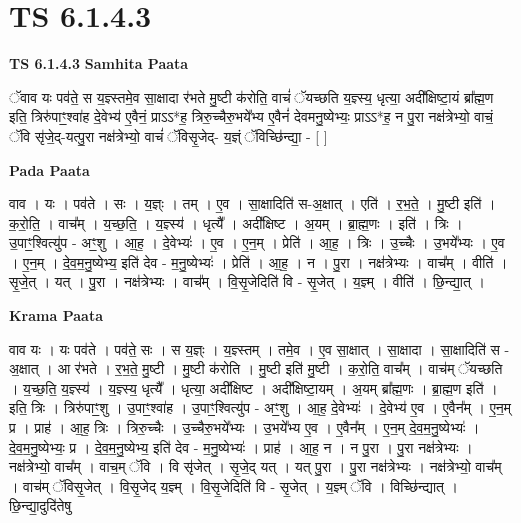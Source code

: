 \documentclass[17pt]{extarticle}
\begin{document}
\section{ TS 6.1.4.3 }

\textbf{TS 6.1.4.3 } \newline
\textbf{Samhita Paata} \newline

ॅवाव यः पव॑ते॒ स य॒ज्ञ्स्तमे॒व सा॒क्षादा र॑भते मु॒ष्टी क॑रोति॒ वाचं॑ ॅयच्छति य॒ज्ञ्स्य॒ धृत्या॒ अदी᳚क्षिष्टा॒यं ब्रा᳚ह्म॒ण इति॒ त्रिरु॑पाꣳ॒॒श्वा॑ह दे॒वेभ्य॑ ए॒वैनं॒ प्राऽऽ*ह॒ त्रिरु॒च्चैरु॒भये᳚भ्य ए॒वैनं॑ देवमनु॒ष्येभ्यः॒ प्राऽऽ*ह॒ न पु॒रा नक्ष॑त्रेभ्यो॒ वाचं॒ ॅवि सृ॑जे॒द्-यत्पु॒रा नक्ष॑त्रेभ्यो॒ वाचं॑ ॅविसृ॒जेद्- य॒ज्ञ्ं ॅविच्छि॑न्द्या॒ - [  ] \newline

\textbf{Pada Paata} \newline

वाव । यः । पव॑ते । सः । य॒ज्ञ्ः । तम् । ए॒व । सा॒क्षादिति॑ स-अ॒क्षात् । एति॑ । र॒भ॒ते॒ । मु॒ष्टी इति॑ । क॒रो॒ति॒ । वाच᳚म् । य॒च्छ॒ति॒ । य॒ज्ञ्स्य॑ । धृत्यै᳚ । अदी᳚क्षिष्ट । अ॒यम् । ब्रा॒ह्म॒णः । इति॑ । त्रिः । उ॒पाꣳ॒॒श्वित्यु॑प - अꣳ॒॒शु । आ॒ह॒ । दे॒वेभ्यः॑ । ए॒व । ए॒न॒म् । प्रेति॑ । आ॒ह॒ । त्रिः । उ॒च्चैः । उ॒भये᳚भ्यः । ए॒व । ए॒न॒म् । दे॒व॒म॒नु॒ष्येभ्य॒ इति॑ देव - म॒नु॒ष्येभ्यः॑ । प्रेति॑ । आ॒ह॒ । न । पु॒रा । नक्ष॑त्रेभ्यः । वाच᳚म् । वीति॑ । सृ॒जे॒त् । यत् । पु॒रा । नक्ष॑त्रेभ्यः । वाच᳚म् । वि॒सृ॒जेदिति॑ वि - सृ॒जेत् । य॒ज्ञ्म् । वीति॑ । छि॒न्द्या॒त् ।  \newline


\textbf{Krama Paata} \newline

वाव यः । यः पव॑ते । पव॑ते॒ सः । स य॒ज्ञ्ः । य॒ज्ञ्स्तम् । तमे॒व । ए॒व सा॒क्षात् । सा॒क्षादा । सा॒क्षादिति॑ स - अ॒क्षात् । आ र॑भते । र॒भ॒ते॒ मु॒ष्टी । मु॒ष्टी क॑रोति । मु॒ष्टी इति॑ मु॒ष्टी । क॒रो॒ति॒ वाच᳚म् । वाच॑म् ॅयच्छति । य॒च्छ॒ति॒ य॒ज्ञ्स्य॑ । य॒ज्ञ्स्य॒ धृत्यै᳚ । धृत्या॒ अदी᳚क्षिष्ट । अदी᳚क्षिष्टा॒यम् । अ॒यम् ब्रा᳚ह्म॒णः । ब्रा॒ह्म॒ण इति॑ । इति॒ त्रिः । त्रिरु॑पाꣳ॒॒शु । उ॒पाꣳ॒॒श्वा॑ह । उ॒पाꣳ॒॒श्वित्यु॑प - अꣳ॒॒शु । आ॒ह॒ दे॒वेभ्यः॑ । दे॒वेभ्य॑ ए॒व । ए॒वैन᳚म् । ए॒न॒म् प्र । प्राह॑ । आ॒ह॒ त्रिः । त्रिरु॒च्चैः । उ॒च्चैरु॒भये᳚भ्यः । उ॒भये᳚भ्य ए॒व । ए॒वैन᳚म् । ए॒न॒म् दे॒व॒म॒नु॒ष्येभ्यः॑ । दे॒व॒म॒नु॒ष्येभ्यः॒ प्र । दे॒व॒म॒नु॒ष्येभ्य॒ इति॑ देव - म॒नु॒ष्येभ्यः॑ । प्राह॑ । आ॒ह॒ न । न पु॒रा । पु॒रा नक्ष॑त्रेभ्यः । नक्ष॑त्रेभ्यो॒ वाच᳚म् । वाच॒म् ॅवि । वि सृ॑जेत् । सृ॒जे॒द् यत् । यत् पु॒रा । पु॒रा नक्ष॑त्रेभ्यः । नक्ष॑त्रेभ्यो॒ वाच᳚म् । वाच॑म् ॅविसृ॒जेत् । वि॒सृ॒जेद् य॒ज्ञ्म् । वि॒सृ॒जेदिति॑ वि - सृ॒जेत् । य॒ज्ञ्म् ॅवि । विच्छि॑न्द्यात् । छि॒न्द्या॒दुदि॑तेषु \newline
\end{document}
